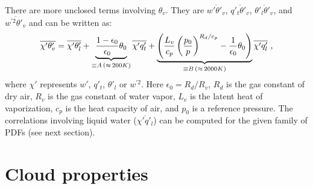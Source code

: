 \documentclass[11pt,fleqn]{article}
\begin{document}
There are more unclosed terms involving $\theta_v$. They are
$\overline{w'\theta'_v}$, $\overline{q'_t\theta'_v}$,
$\overline{\theta'_l\theta'_v}$, and $\overline{w^{'2}\theta'_v}$ and can be
written as:
%
\begin{equation}
\overline{\chi'\theta'_v} 
= \overline{\chi'\theta'_l} 
+ \underbrace{ \frac{1-\epsilon_0}{\epsilon_0} \theta_0 
             }_{\equiv A \, (\approx \, 200 K)}
  \overline{\chi'q'_t}
+ \underbrace{
   \left( 
     \frac{L_v}{c_p} \left( \frac{p_0}{p} \right)^{R_d/c_p}      
     - \frac{1}{\epsilon_0}\theta_0
   \right) }_{\equiv B \, (\approx \, 2000 K)}
  \overline{\chi'q'_l} \hbox{ ,}
\end{equation}
% 
where $\chi'$ represents $w'$, $q'_t$, $\theta'_l$ or $w^{'2}$.
Here $\epsilon_0 = R_d/R_v$, $R_d$ is the gas constant of dry air, 
$R_v$ is the gas constant of water vapor, $L_v$ is the latent heat 
of vaporization, $c_p$ is the heat capacity of air, 
and $p_0$ is a reference pressure. The correlations involving
liquid water ($\overline{\chi'q'_l}$) can be computed for the given
family of PDFs (see next section).

\section{Cloud properties}
\end{document}
